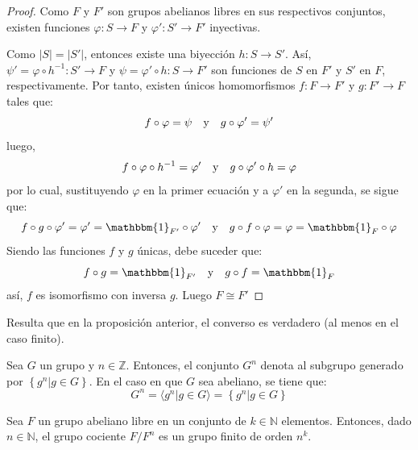\documentclass[12pt]{report}
\newcounter{it}
\theoremstyle{largebreak}
\newcommand\abs[1]{\ensuremath{\left|#1\right|}}
\newcommand\cf[3]{\ensuremath{#1:#2\rightarrow#3}}
\newcommand{\bbm}[1]{\mathbbm{#1}}
\begin{document}
    \begin{proof}
        Como $F$ y $F'$ son grupos abelianos libres en sus respectivos conjuntos, existen funciones $\cf{\varphi}{S}{F}$ y $\cf{\varphi'}{S'}{F'}$ inyectivas.

        Como $\abs{S}=\abs{S'}$, entonces existe una biyección $\cf{h}{S}{S'}$. Así, $\cf{\psi'=\varphi\circ h^{-1}}{S'}{F}$ y $\cf{\psi=\varphi'\circ h}{S}{F'}$ son funciones de $S$ en $F'$ y $S'$ en $F$, respectivamente. Por tanto, existen únicos homomorfismos $\cf{f}{F}{F'}$ y $\cf{g}{F'}{F}$ tales que:
        \begin{equation*}
            f\circ \varphi=\psi\quad\textup{y}\quad g\circ\varphi'=\psi'
        \end{equation*}
        luego,
        \begin{equation*}
            f\circ\varphi\circ h^{-1}=\varphi'\quad\textup{y}\quad g\circ\varphi'\circ h=\varphi
        \end{equation*}
        por lo cual, sustituyendo $\varphi$ en la primer ecuación y a $\varphi'$ en la segunda, se sigue que:
        \begin{equation*}
            f\circ g\circ\varphi'=\varphi'=\bbm{1}_{F'}\circ\varphi' \quad\textup{y}\quad g\circ f\circ\varphi=\varphi=\bbm{1}_{F}\circ\varphi
        \end{equation*}
        Siendo las funciones $f$ y $g$ únicas, debe suceder que:
        \begin{equation*}
            f\circ g=\bbm{1}_{ F'}\quad\textup{y}\quad g\circ f=\bbm{1}_{ F}
        \end{equation*}
        así, $f$ es isomorfismo con inversa $g$. Luego $F\cong F'$
    \end{proof}

    Resulta que en la proposición anterior, el converso es verdadero (al menos en el caso finito).

    \begin{mydef}
        Sea $G$ un grupo y $n\in\mathbb{Z}$. Entonces, el conjunto $G^n$ denota al subgrupo generado por $\left\{g^n\Big|g\in G \right\}$. En el caso en que $G$ sea abeliano, se tiene que:
        \begin{equation*}
            G^n=\langle g^n\Big|g\in G\rangle=\left\{g^n\Big|g\in G \right\}
        \end{equation*}
    \end{mydef}

    \begin{lema}
        Sea $F$ un grupo abeliano libre en un conjunto de $k\in\mathbb{N}$ elementos. Entonces, dado $n\in\mathbb{N}$, el grupo cociente $F/F^n$ es un grupo finito de orden $n^k$.
    \end{lema}
\end{document}
